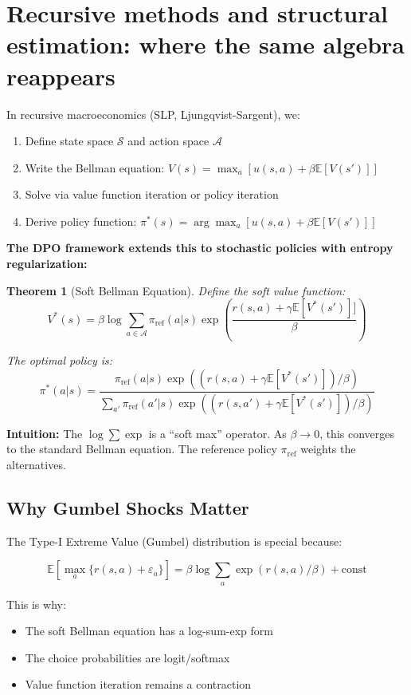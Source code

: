 \documentclass[11pt]{article}
\newcommand{\1}{\mathbf{1}}
\theoremstyle{plain}
\newtheorem{theorem}{Theorem}
\theoremstyle{definition}
\theoremstyle{remark}
\begin{document}
\section{Recursive methods and structural estimation: where the same algebra reappears}
In recursive macroeconomics (SLP, Ljungqvist-Sargent), we:
\begin{enumerate}
\item Define state space $\mathcal{S}$ and action space $\mathcal{A}$
\item Write the Bellman equation: $V(s) = \max_a [u(s,a) + \beta \mathbb{E}[V(s')]]$
\item Solve via value function iteration or policy iteration
\item Derive policy function: $\pi^*(s) = \arg\max_a [u(s,a) + \beta \mathbb{E}[V(s')]]$
\end{enumerate}

\textbf{The DPO framework extends this to stochastic policies with entropy regularization:}

\begin{theorem}[Soft Bellman Equation]
Define the soft value function:
$$
V^*(s) = \beta \log \sum_{a \in \mathcal{A}} \pi_{\text{ref}}(a|s) \exp\left(\frac{r(s,a) + \gamma \mathbb{E}[V^*(s')]]}{\beta}\right)
$$

The optimal policy is:
$$
\pi^*(a|s) = \frac{\pi_{\text{ref}}(a|s) \exp((r(s,a) + \gamma \mathbb{E}[V^*(s')])/\beta)}{\sum_{a'} \pi_{\text{ref}}(a'|s) \exp((r(s,a') + \gamma \mathbb{E}[V^*(s')])/\beta)}
$$
\end{theorem}

\textbf{Intuition:} The $\log \sum \exp$ is a ``soft max'' operator. As $\beta \to 0$, this converges to the standard Bellman equation. The reference policy $\pi_{\text{ref}}$ weights the alternatives.

\subsection{Why Gumbel Shocks Matter}

The Type-I Extreme Value (Gumbel) distribution is special because:

$$
\mathbb{E}\left[\max_a \{r(s,a) + \varepsilon_a\}\right] = \beta \log \sum_a \exp(r(s,a)/\beta) + \text{const}
$$

This is why:
\begin{itemize}
\item The soft Bellman equation has a log-sum-exp form
\item The choice probabilities are logit/softmax
\item Value function iteration remains a contraction
\end{itemize}
\end{document}
